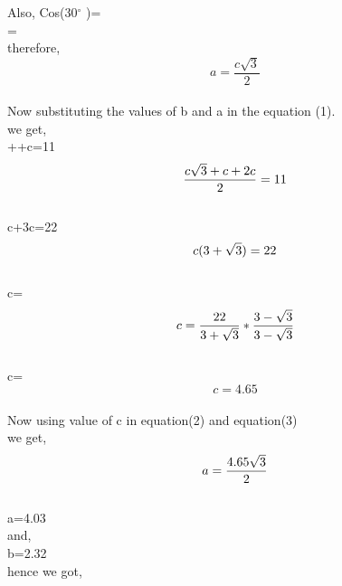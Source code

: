 \documentclass[a4paper,12pt]{article}
\begin{document}
Also,
Cos(30$^{\circ}$ )= \\

=\\

therefore,\\
\begin{equation}
    a=\dfrac{c\sqrt{3}}{2}
\end{equation}\\

Now substituting the values of b and a in the equation (1).\\
we get,\\

++c=11\\$$\\

\dfrac{c\sqrt{3}+c+2c}{2}=11\\$$\\

c+3c=22\\$$\\

c(3+\sqrt{3})=22\\$$\\

c= \\$$\\

c= \dfrac{22}{3+\sqrt{3}}* \dfrac{3-\sqrt{3}}{3-\sqrt{3}}\\$$\\

c=\\

\begin{equation}
    c=4.65
\end{equation}\\

Now using value of c in equation(2) and equation(3)\\
we get,\\$$\\

a=\dfrac{4.65\sqrt{3}}{2}\\$$\\
a=4.03 \\
and,\\
b=2.32\\

hence we got,\\


\\
\end{document}
